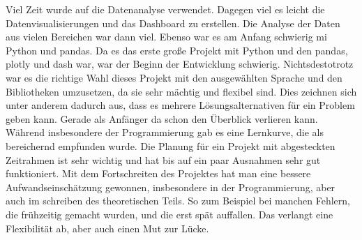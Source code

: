 Viel Zeit wurde auf die Datenanalyse verwendet. Dagegen viel es leicht die Datenvisualisierungen und das Dashboard
zu erstellen. Die Analyse der Daten aus vielen Bereichen war dann viel. Ebenso war es am Anfang schwierig mi Python und pandas.
Da es das erste große Projekt mit Python und den pandas, plotly und dash war, war der Beginn der Entwicklung schwierig.
Nichtsdestotrotz war es die richtige Wahl dieses Projekt mit den ausgewählten Sprache und den Bibliotheken umzusetzen, da sie sehr mächtig und
flexibel sind. Dies zeichnen sich unter anderem dadurch aus, dass es mehrere Lösungsalternativen für ein Problem geben kann. Gerade als
Anfänger da schon den Überblick verlieren kann. Während insbesondere der Programmierung gab es eine Lernkurve, die als bereichernd empfunden wurde.
Die Planung für ein Projekt mit abgesteckten Zeitrahmen ist sehr wichtig und hat bis auf ein paar Ausnahmen sehr gut funktioniert.
Mit dem Fortschreiten des Projektes hat man eine bessere Aufwandseinschätzung gewonnen, insbesondere in der Programmierung, aber auch im schreiben
des theoretischen Teils. So zum Beispiel bei manchen Fehlern, die frühzeitig gemacht wurden, und die erst spät auffallen. 
Das verlangt eine Flexibilität ab, aber auch einen Mut zur Lücke.




